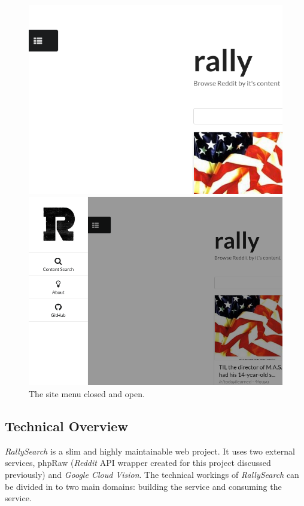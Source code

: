 \documentclass[msc,oneside]{ubcthesis}%
\begin{document}
\begin{figure}[H]
\begin{multicols}{2}
    \includegraphics[width=\linewidth]{menu_closed.png}\par 
    \includegraphics[width=\linewidth]{menu_open.png}\par 
\end{multicols}
\caption{The site menu closed and open.}
\end{figure}

\subsection{Technical Overview}
\textit{RallySearch} is a slim and highly maintainable web project. It uses two external services, phpRaw (\textit{Reddit} API wrapper created for this project discussed previously) and \textit{Google Cloud Vision}. The technical workings of \textit{RallySearch} can be divided in to two main domains: building the service and consuming the service.
\end{document}
